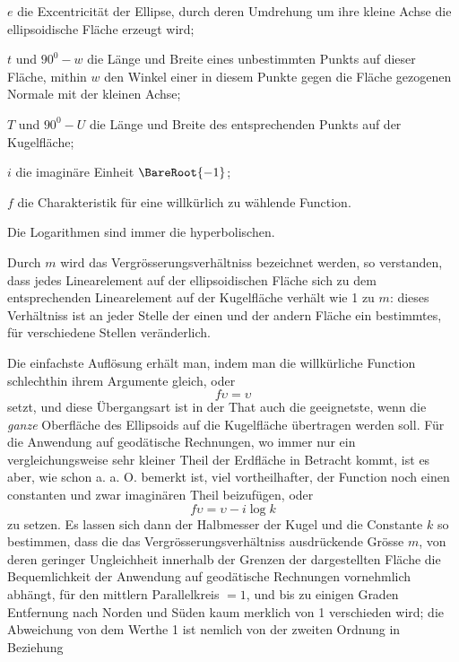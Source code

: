\begin{list}{}{\setlength{\leftmargin}{1.5em}\setlength{\itemindent}{-1.5em}\setlength{\itemsep}{0pt}\setlength{\parsep}{0pt}}
\item \(e\) die Excentricität der Ellipse, durch deren Umdrehung um ihre kleine Achse die ellipsoidische Fläche erzeugt wird;
\item \(t\) und \(90^0-w\) die Länge und Breite eines unbestimmten Punkts auf dieser Fläche, mithin \(w\) den Winkel einer in diesem Punkte gegen die Fläche gezogenen Normale mit der kleinen Achse;
\item \(T\) und \(90^0-U\) die Länge und Breite des entsprechenden Punkts auf der Kugelfläche;
\item \(i\) die imaginäre Einheit \(\BareRoot{-1}\);
\item \(f\) die Charakteristik für eine willkürlich zu wählende Function.
\end{list}
\noindent Die Logarithmen sind immer die hyperbolischen.\par
\noindent Durch \(m\) wird das Vergrösserungsverhältniss bezeichnet werden, so verstanden, dass jedes Linearelement auf der ellipsoidischen Fläche sich zu dem entsprechenden Linearelement auf der Kugelfläche verhält wie 1 zu \(m\): dieses Verhältniss ist an jeder Stelle der einen und der andern Fläche ein bestimmtes, für verschiedene Stellen veränderlich.

Die einfachste Auflösung erhält man, indem man die willkürliche Function schlechthin ihrem Argumente gleich, oder
\[
f\upsilon=\upsilon
\]
setzt, und diese Übergangsart ist in der That auch die geeignetste, wenn die \textit{ganze} Oberfläche des Ellipsoids auf die Kugelfläche übertragen werden soll. Für die Anwendung auf geodätische Rechnungen, wo immer nur ein vergleichungsweise sehr kleiner Theil der Erdfläche in Betracht kommt, ist es aber, wie schon a. a. O. bemerkt ist, viel vortheilhafter, der Function noch einen constanten und zwar imaginären Theil beizufügen, oder
\[
f\upsilon=\upsilon-i\log k
\]
zu setzen. Es lassen sich dann der Halbmesser der Kugel und die Constante \(k\) so bestimmen, dass die das Vergrösserungsverhältniss ausdrückende Grösse \(m\), von deren geringer Ungleichheit innerhalb der Grenzen der dargestellten Fläche die Bequemlichkeit der Anwendung auf geodätische Rechnungen vornehmlich abhängt, für den mittlern Parallelkreis \(=1\), und bis zu einigen Graden Entfernung nach Norden und Süden kaum merklich von 1 verschieden wird; die Abweichung von dem Werthe 1 ist nemlich von der zweiten Ordnung in Beziehung
